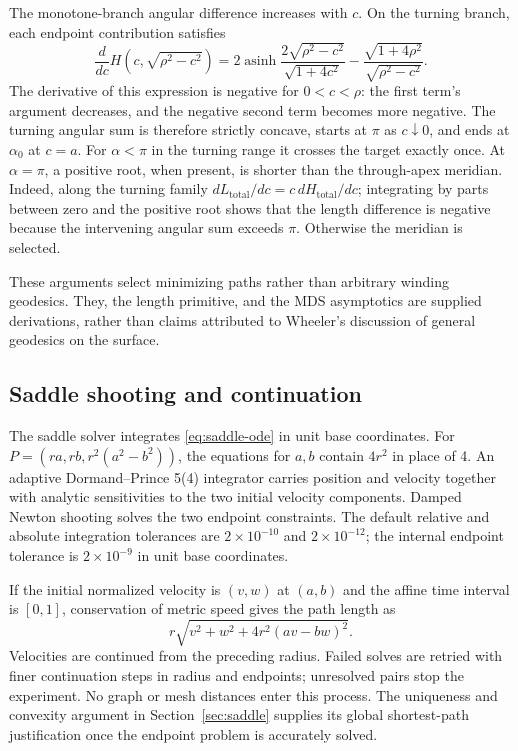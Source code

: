 \documentclass[11pt]{article}
\theoremstyle{remark}\newtheorem{remark}[proposition]{Remark}
\newcommand{\asinh}{\operatorname{asinh}}
\begin{document}
The monotone-branch angular difference increases with $c$. On the turning
branch, each endpoint contribution satisfies
\begin{equation}
 \frac{d}{dc}H(c,\sqrt{\rho^2-c^2})
 =2\asinh\!\frac{2\sqrt{\rho^2-c^2}}{\sqrt{1+4c^2}}
  -\frac{\sqrt{1+4\rho^2}}{\sqrt{\rho^2-c^2}}.
\end{equation}
The derivative of this expression is negative for $0<c<\rho$: the first
term's argument decreases, and the negative second term becomes more negative.
The turning angular sum is therefore strictly concave, starts at $\pi$ as
$c\downarrow0$, and ends at $\alpha_0$ at $c=a$. For $\alpha<\pi$ in the
turning range it crosses the target exactly once. At $\alpha=\pi$, a positive
root, when present, is shorter than the through-apex meridian. Indeed, along
the turning family $dL_{\mathrm{total}}/dc=c\,dH_{\mathrm{total}}/dc$;
integrating by parts between zero and the positive root shows that the length
difference is negative because the intervening angular sum exceeds $\pi$.
Otherwise the meridian is selected.

These arguments select minimizing paths rather than arbitrary winding
geodesics. They, the length primitive, and the MDS asymptotics are supplied
derivations, rather than claims attributed to Wheeler's discussion of general
geodesics on the surface.

\subsection{Saddle shooting and continuation}
The saddle solver integrates \eqref{eq:saddle-ode} in unit base coordinates.
For $P=(ra,rb,r^2(a^2-b^2))$, the equations for $a,b$ contain $4r^2$ in place
of 4. An adaptive Dormand--Prince 5(4) integrator carries position and velocity
together with analytic sensitivities to the two initial velocity components.
Damped Newton shooting solves the two endpoint constraints. The default
relative and absolute integration tolerances are $2\times10^{-10}$ and
$2\times10^{-12}$; the internal endpoint tolerance is $2\times10^{-9}$ in
unit base coordinates.

If the initial normalized velocity is $(v,w)$ at $(a,b)$ and the affine time
interval is $[0,1]$, conservation of metric speed gives the path length as
\begin{equation}
 r\sqrt{v^2+w^2+4r^2(av-bw)^2}.
\end{equation}
Velocities are continued from the preceding radius. Failed solves are retried
with finer continuation steps in radius and endpoints; unresolved pairs stop
the experiment. No graph or mesh distances enter this process. The uniqueness
and convexity argument in Section~\ref{sec:saddle} supplies its global
shortest-path justification once the endpoint problem is accurately solved.
\end{document}
